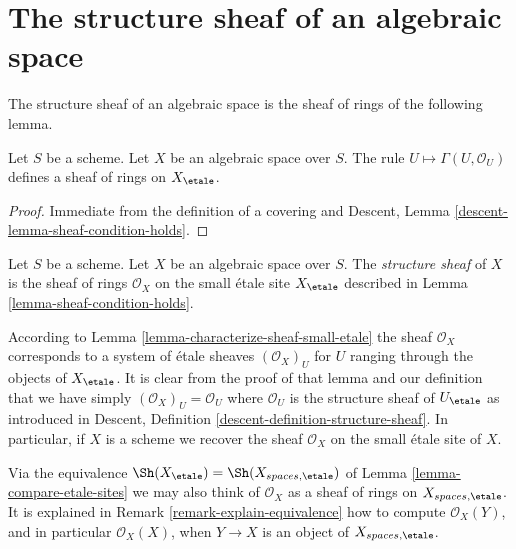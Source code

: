 \section{The structure sheaf of an algebraic space}
\label{section-structure-sheaf}

\noindent
The structure sheaf of an algebraic space is the sheaf of rings of the
following lemma.

\begin{lemma}
\label{lemma-sheaf-condition-holds}
Let $S$ be a scheme. Let $X$ be an algebraic space over $S$.
The rule $U \mapsto \Gamma(U, \mathcal{O}_U)$ defines
a sheaf of rings on $X_\etale$.
\end{lemma}

\begin{proof}
Immediate from the definition of a covering and
Descent, Lemma \ref{descent-lemma-sheaf-condition-holds}.
\end{proof}

\begin{definition}
\label{definition-structure-sheaf}
Let $S$ be a scheme.
Let $X$ be an algebraic space over $S$.
The {\it structure sheaf} of $X$
is the sheaf of rings $\mathcal{O}_X$
on the small \'etale site $X_\etale$ described in
Lemma \ref{lemma-sheaf-condition-holds}.
\end{definition}

\noindent
According to Lemma \ref{lemma-characterize-sheaf-small-etale} the sheaf
$\mathcal{O}_X$ corresponds to a system of \'etale sheaves $(\mathcal{O}_X)_U$
for $U$ ranging through the objects of $X_\etale$. It is clear from
the proof of that lemma and our definition that we have simply
$(\mathcal{O}_X)_U = \mathcal{O}_U$ where $\mathcal{O}_U$ is the structure
sheaf of $U_\etale$ as introduced in
Descent, Definition \ref{descent-definition-structure-sheaf}.
In particular, if $X$ is a scheme we recover the sheaf $\mathcal{O}_X$
on the small \'etale site of $X$.

\medskip\noindent
Via the equivalence
$\Sh(X_\etale) = \Sh(X_{spaces, \etale})$
of Lemma \ref{lemma-compare-etale-sites} we may also think of $\mathcal{O}_X$
as a sheaf of rings on $X_{spaces, \etale}$. It is explained in
Remark \ref{remark-explain-equivalence}
how to compute $\mathcal{O}_X(Y)$, and in particular $\mathcal{O}_X(X)$, when
$Y \to X$ is an object of $X_{spaces, \etale}$.

